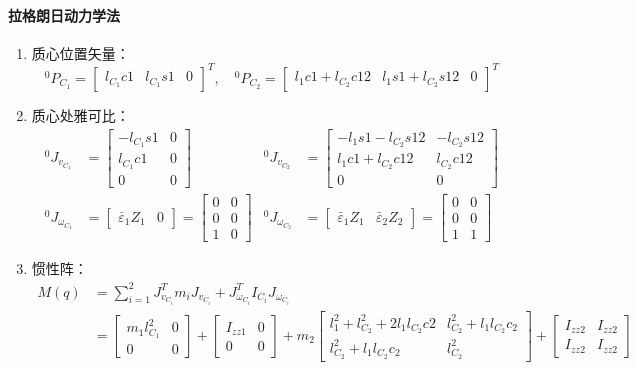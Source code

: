 \documentclass[
12pt, %
a4paper, 
oneside, %
]{scrartcl}
\begin{document}
{\paragraph{拉格朗日动力学法}
\begin{enumerate}
\item 质心位置矢量：
$$ {}^0 P_{C_1} = \begin{bmatrix} l_{C_1}c1 & l_{C_1}s1 & 0 \end{bmatrix}^T, \quad {}^0 P_{C_2} = \begin{bmatrix} l_1 c1 + l_{C_2}c12 & l_1 s1 + l_{C_2}s12 & 0 \end{bmatrix}^T $$
\item 质心处雅可比：
\begin{align*}
{}^0 J_{v_{C_1}} &= \begin{bmatrix} -l_{C_1}s1 & 0 \\ l_{C_1}c1 & 0 \\ 0 & 0 \end{bmatrix}& {}^0 J_{v_{C_2}} &= \begin{bmatrix} -l_1 s1 - l_{C_2}s12 & -l_{C_2}s12 \\ l_1 c1 + l_{C_2}c12 & l_{C_2}c12 \\ 0 & 0 \end{bmatrix} \\
{}^0 J_{\omega_{C_1}} &= \begin{bmatrix} \bar{\varepsilon}_1 Z_1 & 0 \end{bmatrix} = \begin{bmatrix} 0 & 0 \\ 0 & 0 \\ 1 & 0 \end{bmatrix}& {}^0 J_{\omega_{C_2}} &= \begin{bmatrix} \bar{\varepsilon}_1 Z_1 & \bar{\varepsilon}_2 Z_2 \end{bmatrix} = \begin{bmatrix} 0 & 0 \\ 0 & 0 \\ 1 & 1 \end{bmatrix}
\end{align*}
\item 惯性阵：
\begin{align*}
M(q) &= \sum_{i = 1}^{2} J_{v_{C_i}}^T m_i J_{v_{C_i}} + J_{\omega_{C_i}}^T I_{C_i} J_{\omega_{C_i}} \\
&= \begin{bmatrix} m_1l_{C_1}^2 & 0 \\ 0 & 0 \end{bmatrix} + \begin{bmatrix} I_{zz1} & 0 \\ 0 & 0 \end{bmatrix} + m_2 \begin{bmatrix} l_1^2 + l_{C_2}^2 + 2l_1 l_{C_2}c2 & l_{C_2}^2 + l_1 l_{C_2}c_2 \\ l_{C_2}^2 + l_1 l_{C_2}c_2 & l_{C_2}^2 \end{bmatrix} + \begin{bmatrix} I_{zz2} & I_{zz2} \\ I_{zz2} & I_{zz2} \end{bmatrix} \\

\end{align*}
\end{enumerate}}
\end{document}
